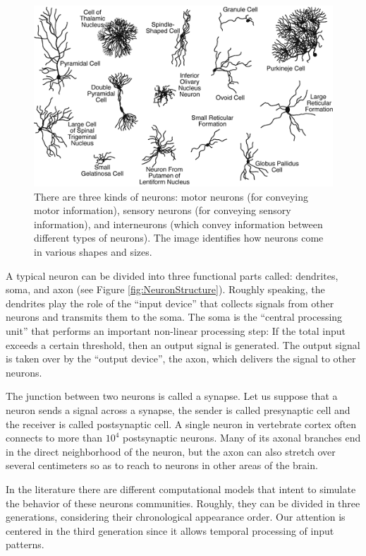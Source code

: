 \begin{figure}[ht]
    \centering
    \includegraphics[scale=0.7]{images/Figure1Neuron_Types.png}
    \caption[Types of neurons]{\small{There are three kinds of neurons: motor neurons (for conveying motor information), sensory neurons (for conveying sensory information), and interneurons (which convey information between different types of neurons). The image identifies how neurons come in various shapes and sizes.}}
    \label{fig:NeuronTypes}
\end{figure}

A typical neuron can be divided into three functional parts called: dendrites, soma, and axon (see Figure \ref{fig:NeuronStructure}). Roughly speaking, the dendrites play the role of the ``input device'' that collects signals from other neurons and transmits them to the soma. The soma is the ``central processing unit'' that performs an important non-linear processing step: If the total input exceeds a certain threshold, then an output signal is generated. The output signal is taken over by the ``output device'', the axon, which delivers the signal to other neurons.

The junction between two neurons is called a synapse. Let us suppose that a neuron sends a signal across a synapse, the sender is called presynaptic cell and the receiver is called postsynaptic cell. A single neuron in vertebrate cortex often connects to more than $10^4$ postsynaptic neurons. Many of its axonal branches end in the direct neighborhood of the neuron, but the axon can also stretch over several centimeters so as to reach to neurons in other areas of the brain.

In the literature there are different computational models that intent to simulate the behavior of these neurons communities. Roughly, they can be divided in three generations, considering their chronological appearance order. Our attention is centered in the third generation since it allows temporal processing of input patterns.

